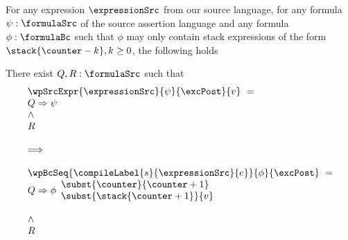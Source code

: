 \begin{exprSrcBcWp1} \label{exprValueOnStack}
 For any expression $\expressionSrc$ from our source language, for any formula $\psi: \formulaSrc$  
of the source assertion language and any formula $\phi: \formulaBc$ such that $\phi$ may only 
contain stack expressions of the form     $\stack{\counter - k}, k \ge 0$, the following holds



  There  exist $ Q, R : \formulaSrc$  such that 
$$ \begin{array}{l}
      \wpSrcExpr{\expressionSrc }{ \psi }{ \excPost}{v} \  = \\ 
          Q \Rightarrow \psi \\
          \wedge \\ 
	  R  \\
  \\
\Longrightarrow \\
 \\

  
	    \wpBcSeq{ \compileLabel{s}{\expressionSrc}{e} }{ \phi }{\excPost} \  = \\ 
              Q \Rightarrow \phi \begin{array}{l}
                                       \subst{\counter}{\counter + 1}\\
			               \subst{\stack{\counter +1}}{ v }
                         \end{array} \\ \\
          \wedge \\ 
	  R 
  \end{array}$$

\end{exprSrcBcWp1}


